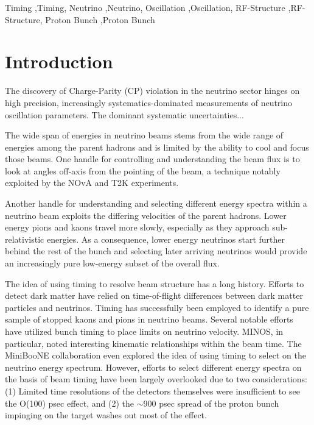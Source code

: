 \documentclass[preprint,12pt]{elsarticle}
\begin{document}
\begin{frontmatter}
\begin{keyword}
Timing \sep Timing, Neutrino \sep Neutrino, Oscillation \sep Oscillation, RF-Structure \sep RF-Structure, Proton Bunch \sep Proton Bunch

\end{keyword}

\end{frontmatter}

\linenumbers

\section{Introduction}
\label{sec:intro}

The discovery of Charge-Parity (CP) violation in the neutrino sector hinges on high precision, increasingly systematics-dominated measurements of neutrino oscillation parameters. The dominant systematic uncertainties...

The wide span of energies in neutrino beams stems from the wide range of energies among the parent hadrons and is limited by the ability to cool and focus those beams. One handle for controlling and understanding the beam flux is to look at angles off-axis from the pointing of the beam, a technique notably exploited by the NOvA and T2K experiments.

Another handle for understanding and selecting different energy spectra within a neutrino beam exploits the differing velocities of the parent hadrons. Lower energy pions and kaons travel more slowly, especially as they approach sub-relativistic energies. As a consequence, lower energy neutrinos start further behind the rest of the bunch and selecting later arriving neutrinos would provide an increasingly pure low-energy subset of the overall flux.

The idea of using timing to resolve beam structure has a long history. Efforts to detect dark matter have relied on time-of-flight differences between dark matter particles and neutrinos. Timing has successfully been employed to identify a pure sample of stopped kaons and pions in neutrino beams. Several notable efforts have utilized bunch timing to place limits on neutrino velocity. MINOS, in particular, noted interesting kinematic relationships within the beam time. The MiniBooNE collaboration even explored the idea of using timing to select on the neutrino energy spectrum. However, efforts to select different energy spectra on the basis of beam timing have been largely overlooked due to two considerations: (1) Limited time resolutions of the detectors themselves were insufficient to see the O(100) psec effect, and (2) the $\sim$900 psec spread of the proton bunch impinging on the target washes out most of the effect.
\end{document}
